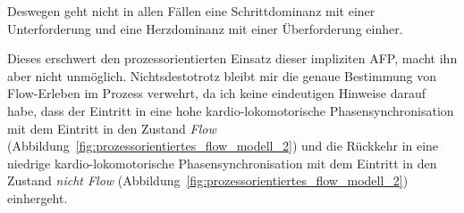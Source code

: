 Deswegen geht nicht in allen Fällen eine Schrittdominanz mit einer Unterforderung und eine Herzdominanz mit einer Überforderung einher. 

Dieses erschwert den prozessorientierten Einsatz dieser impliziten \ac{AFP}, macht ihn aber nicht unmöglich. Nichtsdestotrotz bleibt mir die genaue Bestimmung von Flow-Erleben im Prozess verwehrt, da ich keine eindeutigen Hinweise darauf habe, dass der Eintritt in eine hohe kardio-lokomotorische Phasensynchronisation mit dem Eintritt in den Zustand \emph{Flow} (Abbildung~\ref{fig:prozessorientiertes_flow_modell_2}) und die Rückkehr in eine niedrige kardio-lokomotorische Phasensynchronisation mit dem Eintritt in den Zustand \emph{nicht Flow} (Abbildung~\ref{fig:prozessorientiertes_flow_modell_2}) einhergeht. 

